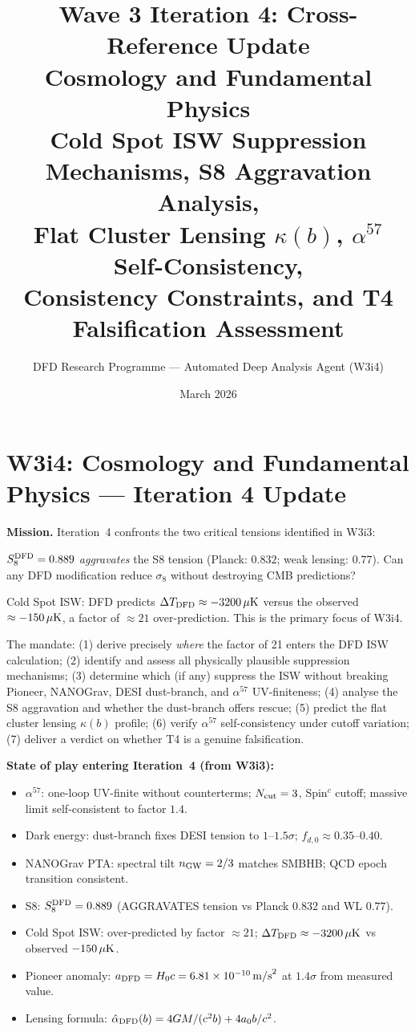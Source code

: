 \documentclass[11pt]{article}
\title{Wave 3 Iteration 4: Cross-Reference Update\\
\large Cosmology and Fundamental Physics\\
\normalsize Cold Spot ISW Suppression Mechanisms, S8 Aggravation Analysis,\\
Flat Cluster Lensing $\kappa(b)$, $\alpha^{57}$ Self-Consistency,\\
Consistency Constraints, and T4 Falsification Assessment}
\author{DFD Research Programme --- Automated Deep Analysis Agent (W3i4)}
\date{March 2026}
\newcommand{\ee}[1]{\times 10^{#1}}
\newcommand{\azero}{a_0}
\newcommand{\DFD}{{\rm DFD}}
\newcommand{\deltaT}{\Delta T}
\begin{document}
\maketitle
\tableofcontents
\newpage

\section*{W3i4: Cosmology and Fundamental Physics --- Iteration 4 Update}
\label{sec:intro}

\noindent\textbf{Mission.} Iteration~4 confronts the two critical tensions
identified in W3i3:
\begin{description}[leftmargin=2em]
  \item[T3] $S_8^{\DFD} = 0.889$ \emph{aggravates} the S8 tension (Planck:
    $0.832$; weak lensing: $0.77$). Can any DFD modification reduce $\sigma_8$
    without destroying CMB predictions?
  \item[T4] Cold Spot ISW: DFD predicts $\deltaT_{\DFD} \approx -3200\,\mu{\rm K}$
    versus the observed $\approx -150\,\mu{\rm K}$, a factor of $\approx 21$
    over-prediction. This is the primary focus of W3i4.
\end{description}

\noindent The mandate: (1) derive precisely \emph{where} the factor of 21
enters the DFD ISW calculation; (2) identify and assess all physically
plausible suppression mechanisms; (3) determine which (if any) suppress the
ISW without breaking Pioneer, NANOGrav, DESI dust-branch, and
$\alpha^{57}$ UV-finiteness; (4) analyse the S8 aggravation and whether the
dust-branch offers rescue; (5) predict the flat cluster lensing $\kappa(b)$
profile; (6) verify $\alpha^{57}$ self-consistency under cutoff variation;
(7) deliver a verdict on whether T4 is a genuine falsification.

\noindent\textbf{State of play entering Iteration~4 (from W3i3):}
\begin{itemize}[nosep]
  \item $\alpha^{57}$: one-loop UV-finite without counterterms; $N_{\rm cut} = 3$,
    Spin$^c$ cutoff; massive limit self-consistent to factor $1.4$.
  \item Dark energy: dust-branch fixes DESI tension to $1$--$1.5\sigma$;
    $f_{d,0} \approx 0.35$--$0.40$.
  \item NANOGrav PTA: spectral tilt $n_{\rm GW} = 2/3$ matches SMBHB;
    QCD epoch transition consistent.
  \item S8: $S_8^{\DFD} = 0.889$ (AGGRAVATES tension vs Planck $0.832$
    and WL $0.77$).
  \item Cold Spot ISW: over-predicted by factor $\approx 21$; $\deltaT_{\DFD}
    \approx -3200\,\mu{\rm K}$ vs observed $-150\,\mu{\rm K}$.
  \item Pioneer anomaly: $a_{\DFD} = H_0 c = 6.81\ee{-10}\,{\rm m/s}^2$
    at $1.4\sigma$ from measured value.
  \item Lensing formula: $\hat{\alpha}_{\DFD}(b) = 4GM/(c^2 b) + 4\azero b/c^2$.
\end{itemize}
\end{document}
